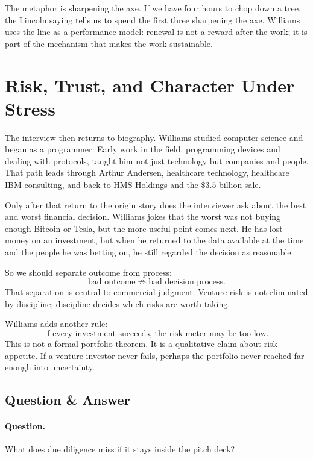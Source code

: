 The metaphor is sharpening the axe. If we have four hours to chop down a tree, the Lincoln saying tells us to spend the first three sharpening the axe. Williams uses the line as a performance model: renewal is not a reward after the work; it is part of the mechanism that makes the work sustainable.

\section{Risk, Trust, and Character Under Stress}

The interview then returns to biography. Williams studied computer science and began as a programmer. Early work in the field, programming devices and dealing with protocols, taught him not just technology but companies and people. That path leads through Arthur Andersen, healthcare technology, healthcare IBM consulting, and back to HMS Holdings and the \(\$3.5\) billion sale.

Only after that return to the origin story does the interviewer ask about the best and worst financial decision. Williams jokes that the worst was not buying enough Bitcoin or Tesla, but the more useful point comes next. He has lost money on an investment, but when he returned to the data available at the time and the people he was betting on, he still regarded the decision as reasonable.

So we should separate outcome from process:
\begin{equation}
\text{bad outcome} \not\Rightarrow \text{bad decision process}.
\end{equation}
That separation is central to commercial judgment. Venture risk is not eliminated by discipline; discipline decides which risks are worth taking.

Williams adds another rule:
\begin{equation}
\text{if every investment succeeds, the risk meter may be too low}.
\end{equation}
This is not a formal portfolio theorem. It is a qualitative claim about risk appetite. If a venture investor never fails, perhaps the portfolio never reached far enough into uncertainty.

\subsection{Question \& Answer}

\paragraph{Question.} What does due diligence miss if it stays inside the pitch deck?

